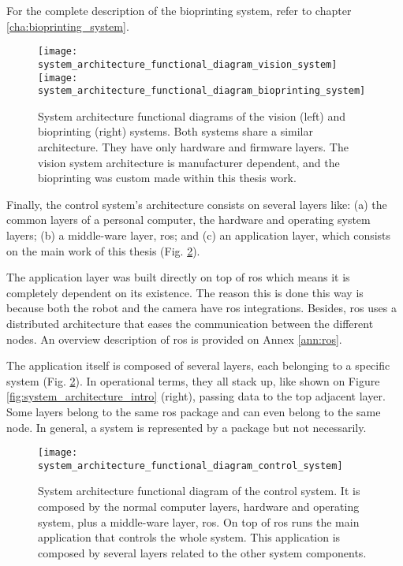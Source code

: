 For the complete description of the bioprinting system, refer to chapter \ref{cha:bioprinting_system}.

\begin{figure}[htbp]
	\centering
	\texttt{[image: system\_architecture\_functional\_diagram\_vision\_system]}
	\hspace{0.1in}
	\texttt{[image: system\_architecture\_functional\_diagram\_bioprinting\_system]}
	\caption{System architecture functional diagrams of the vision (left) and bioprinting (right) systems. Both systems share a similar architecture. They have only hardware and firmware layers. The vision system architecture is manufacturer dependent, and the bioprinting was custom made within this thesis work.}
	\label{fig:system_architecture_functional_diagram_vision_bioprinting_system}
\end{figure}

Finally, the control system's architecture consists on several layers like: (a) the common layers of a personal computer, the hardware and operating system layers; (b) a middle-ware layer, \gls{ros}; and (c) an application layer, which consists on the main work of this thesis (Fig. \ref{fig:system_architecture_functional_diagram_control_system}).

The application layer was built directly on top of \gls{ros} which means it is completely dependent on its existence. The reason this is done this way is because both the robot and the camera have \gls{ros} integrations. Besides, \gls{ros} uses a distributed architecture that eases the communication between the different nodes. An overview description of \gls{ros} is provided on Annex \ref{ann:ros}.

The application itself is composed of several layers, each belonging to a specific system (Fig. \ref{fig:system_architecture_functional_diagram_control_system}). In operational terms, they all stack up, like shown on Figure \ref{fig:system_architecture_intro} (right), passing data to the top adjacent layer. Some layers belong to the same \gls{ros} package and can even belong to the same node. In general, a system is represented by a package but not necessarily.

\begin{figure}[htbp]
	\centering
	\texttt{[image: system\_architecture\_functional\_diagram\_control\_system]}
	\caption{System architecture functional diagram of the control system. It is composed by the normal computer layers, hardware and operating system, plus a middle-ware layer, \gls{ros}. On top of \gls{ros} runs the main application that controls the whole system. This application is composed by several layers related to the other system components.}
	\label{fig:system_architecture_functional_diagram_control_system}
\end{figure}

